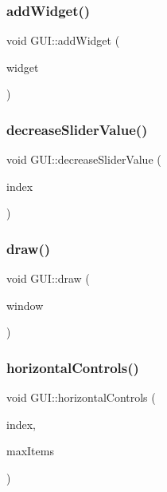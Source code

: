 \mbox{\label{class_g_u_i_a658d7dd36cd27eeedaedecc98ba7e7b4}} 
\subsubsection{\texorpdfstring{addWidget()}{addWidget()}}
{\footnotesize\ttfamily void G\+U\+I\+::add\+Widget (\begin{DoxyParamCaption}\item[{\mbox{\hyperlink{class_widget}{Widget}} $\ast$}]{widget }\end{DoxyParamCaption})}

\mbox{\label{class_g_u_i_a254888c78e0e7fb2d633be5bc5ed2661}} 
\subsubsection{\texorpdfstring{decreaseSliderValue()}{decreaseSliderValue()}}
{\footnotesize\ttfamily void G\+U\+I\+::decrease\+Slider\+Value (\begin{DoxyParamCaption}\item[{int \&}]{index }\end{DoxyParamCaption})}

\mbox{\label{class_g_u_i_a8cea06ea8b346be3b2b261fbec5dee7c}} 
\subsubsection{\texorpdfstring{draw()}{draw()}}
{\footnotesize\ttfamily void G\+U\+I\+::draw (\begin{DoxyParamCaption}\item[{sf\+::\+Render\+Window \&}]{window }\end{DoxyParamCaption})}

\mbox{\label{class_g_u_i_a1be4ce76c68959d8eb392c1fd23f0a50}} 
\subsubsection{\texorpdfstring{horizontalControls()}{horizontalControls()}}
{\footnotesize\ttfamily void G\+U\+I\+::horizontal\+Controls (\begin{DoxyParamCaption}\item[{int \&}]{index,  }\item[{int}]{max\+Items }\end{DoxyParamCaption})}

